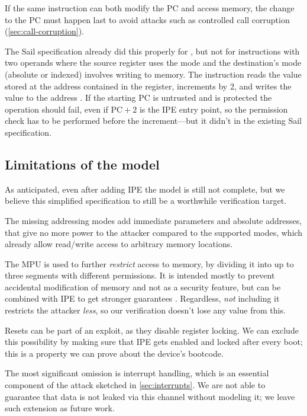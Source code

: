 If the same instruction can both modify the PC and access memory, the change to the PC must happen last to avoid attacks such as controlled call corruption (\cref{sec:call-corruption}).

The Sail specification already did this properly for , but not for instructions with two operands where the source register uses the  mode and the destination's mode (absolute or indexed) involves writing to memory. The instruction  reads the value stored at the address contained in the  register, increments  by 2, and writes the value to the address . If the starting PC is untrusted and  is protected the operation should fail, even if \(\mathrm{PC} + 2\) is the IPE entry point, so the permission check has to be performed before the increment---but it didn't in the existing Sail specification.

\subsection{Limitations of the model}
\label{sec:model-limitations}

As anticipated, even after adding IPE the model is still not complete, but we believe this simplified specification to still be a worthwhile verification target.

The missing addressing modes add immediate parameters and absolute addresses, that give no more power to the attacker compared to the supported modes, which already allow read/write access to arbitrary memory locations.

The MPU is used to further \emph{restrict} access to memory, by dividing it into up to three segments with different permissions. It is intended mostly to prevent accidental modification of memory and not as a security feature, but can be combined with IPE to get stronger guarantees \cite{Bognar2024}. Regardless, \emph{not} including it restricts the attacker \emph{less}, so our verification doesn't lose any value from this.

Resets can be part of an exploit, as they disable register locking. We can exclude this possibility by making sure that IPE gets enabled and locked after every boot; this is a property we can prove about the device's bootcode.

The most significant omission is interrupt handling, which is an essential component of the attack sketched in \cref{sec:interrupts}. We are not able to guarantee that data is not leaked via this channel without modeling it; we leave such extension as future work.

